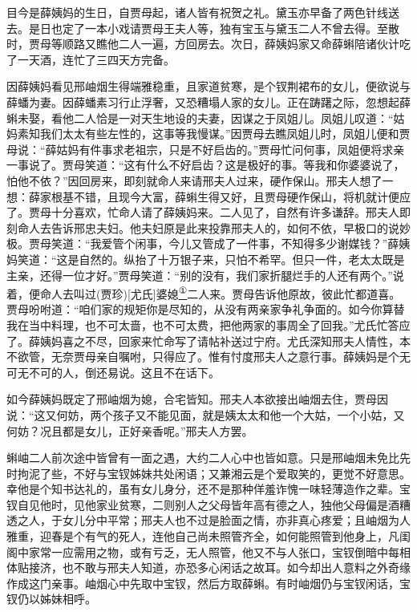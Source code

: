 目今是薛姨妈的生日，自贾母起，诸人皆有祝贺之礼。黛玉亦早备了两色针线送去。是日也定了一本小戏请贾母王夫人等，独有宝玉与黛玉二人不曾去得。至散时，贾母等顺路又瞧他二人一遍，方回房去。次日，薛姨妈家又命薛蝌陪诸伙计吃了一天酒，连忙了三四天方完备。

因薛姨妈看见邢岫烟生得端雅稳重，且家道贫寒，是个钗荆裙布的女儿，便欲说与薛蟠为妻。因薛蟠素习行止浮奢，又恐糟塌人家的女儿。正在踌躇之际，忽想起薛蝌未娶，看他二人恰是一对天生地设的夫妻，因谋之于凤姐儿。凤姐儿叹道：``姑妈素知我们太太有些左性的，这事等我慢谋。''因贾母去瞧凤姐儿时，凤姐儿便和贾母说：``薛姑妈有件事求老祖宗，只是不好启齿的。''贾母忙问何事，凤姐便将求亲一事说了。贾母笑道：``这有什么不好启齿？这是极好的事。等我和你婆婆说了，怕他不依？''因回房来，即刻就命人来请邢夫人过来，硬作保山。邢夫人想了一想：薛家根基不错，且现今大富，薛蝌生得又好，且贾母硬作保山，将机就计便应了。贾母十分喜欢，忙命人请了薛姨妈来。二人见了，自然有许多谦辞。邢夫人即刻命人去告诉邢忠夫妇。他夫妇原是此来投靠邢夫人的，如何不依，早极口的说妙极。贾母笑道：``我爱管个闲事，今儿又管成了一件事，不知得多少谢媒钱？''薛姨妈笑道：``这是自然的。纵抬了十万银子来，只怕不希罕。但只一件，老太太既是主亲，还得一位才好。''贾母笑道：``别的没有，我们家折腿烂手的人还有两个。''说着，便命人去叫过(贾珍){[}尤氏{]}婆媳\href{../Text/part0061_split_000.html\#lnkback_1_a}{\textsuperscript{①}}二人来。贾母告诉他原故，彼此忙都道喜。贾母吩咐道：``咱们家的规矩你是尽知的，从没有两亲家争礼争面的。如今你算替我在当中料理，也不可太啬，也不可太费，把他两家的事周全了回我。''尤氏忙答应了。薛姨妈喜之不尽，回家来忙命写了请帖补送过宁府。尤氏深知邢夫人情性，本不欲管，无奈贾母亲自嘱咐，只得应了。惟有忖度邢夫人之意行事。薛姨妈是个无可无不可的人，倒还易说。这且不在话下。

如今薛姨妈既定了邢岫烟为媳，合宅皆知。邢夫人本欲接出岫烟去住，贾母因说：``这又何妨，两个孩子又不能见面，就是姨太太和他一个大姑，一个小姑，又何妨？况且都是女儿，正好亲香呢。''邢夫人方罢。

蝌岫二人前次途中皆曾有一面之遇，大约二人心中也皆如意。只是邢岫烟未免比先时拘泥了些，不好与宝钗姊妹共处闲语；又兼湘云是个爱取笑的，更觉不好意思。幸他是个知书达礼的，虽有女儿身分，还不是那种佯羞诈愧一味轻薄造作之辈。宝钗自见他时，见他家业贫寒，二则别人之父母皆年高有德之人，独他父母偏是酒糟透之人，于女儿分中平常；邢夫人也不过是脸面之情，亦非真心疼爱；且岫烟为人雅重，迎春是个有气的死人，连他自己尚未照管齐全，如何能照管到他身上，凡闺阁中家常一应需用之物，或有亏乏，无人照管，他又不与人张口，宝钗倒暗中每相体贴接济，也不敢与邢夫人知道，亦恐多心闲话之故耳。如今却出人意料之外奇缘作成这门亲事。岫烟心中先取中宝钗，然后方取薛蝌。有时岫烟仍与宝钗闲话，宝钗仍以姊妹相呼。

